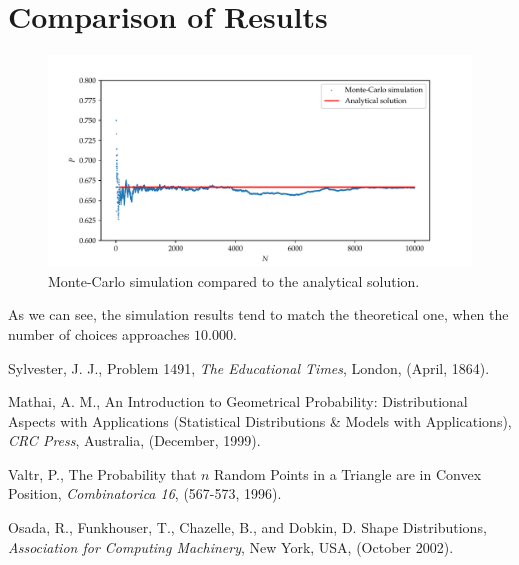 \documentclass{article}
\begin{document}
\newpage

\section{Comparison of Results}
\begin{figure}[h!]
    \centering
    \includegraphics[scale=0.55]{images/result.pdf}
    \caption{Monte-Carlo simulation compared to the analytical solution.}
\end{figure}

As we can see, the simulation results tend to match the theoretical one, when the number of choices approaches $10.000$.

\newpage

\begin{thebibliography}{9}
    Sylvester, J. J., Problem 1491,
    \textit{The Educational Times},
    London, (April, 1864).

    Mathai, A. M., An Introduction to Geometrical Probability: Distributional Aspects with Applications (Statistical Distributions \& Models with Applications),
    \textit{CRC Press},
    Australia, (December, 1999).

    Valtr, P., The Probability that $n$ Random Points in a Triangle are in Convex Position,
    \textit{Combinatorica 16},
    (567-573, 1996).

    Osada, R., Funkhouser, T., Chazelle, B., and Dobkin, D. Shape Distributions,
    \textit{Association for Computing Machinery},
    New York, USA, (October 2002).
\end{thebibliography}
\end{document}
